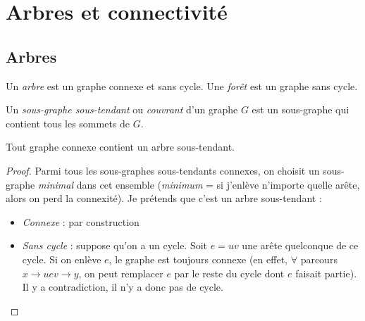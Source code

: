 \section{Arbres et connectivité}
\label{sec-3}
\subsection{Arbres}
\begin{mydef}
  Un \emph{arbre} est un graphe connexe et sans cycle. Une \emph{forêt} est un graphe sans cycle.
\end{mydef}

\begin{mydef}
  Un \emph{sous-graphe sous-tendant} ou \emph{couvrant} d'un graphe $G$ est un sous-graphe qui contient tous les sommets de $G$.
\end{mydef}

\begin{mytheo} 
  Tout graphe connexe contient un arbre sous-tendant.
  \begin{proof}
     Parmi tous les sous-graphes sous-tendants connexes, on choisit un sous-graphe \emph{minimal} dans cet ensemble (\emph{minimum} = si j'enlève n'importe quelle arête, alors on perd la connexité). Je prétends que c'est un arbre sous-tendant :
     \begin{itemize}
     \item \emph{Connexe} : par construction
     \item \emph{Sans cycle} : suppose qu'on a un cycle. Soit $e = uv$ une arête quelconque de ce cycle. Si on enlève $e$, le graphe est toujours connexe (en effet, $\forall$ parcours $x \rightarrow uev \rightarrow y$, on peut remplacer $e$ par le reste du cycle dont $e$ faisait partie).
     Il y a contradiction, il n'y a donc pas de cycle.
     \end{itemize}
  \end{proof}
\end{mytheo}

